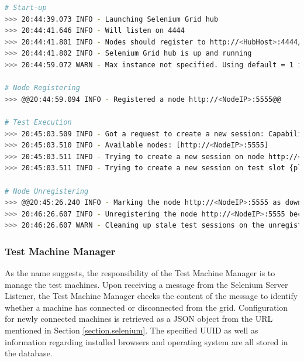 \vspace{4mm}
\noindent\begin{minipage}{\textwidth}
\begin{lstlisting}[caption=Sample Output from Selenium Standalone Server Running as a Hub, label={listing.hub_output}, language=bash, moredelim={[is][keywordstyle]{@@}{@@}}, deletekeywords={for, test}]
# Start-up
>>> 20:44:39.073 INFO - Launching Selenium Grid hub
>>> 20:44:41.646 INFO - Will listen on 4444
>>> 20:44:41.801 INFO - Nodes should register to http://<HubHost>:4444/grid/register/
>>> 20:44:41.802 INFO - Selenium Grid hub is up and running
>>> 20:44:59.072 WARN - Max instance not specified. Using default = 1 instance

# Node Registering
>>> @@20:44:59.094 INFO - Registered a node http://<NodeIP>:5555@@

# Test Execution
>>> 20:45:03.509 INFO - Got a request to create a new session: Capabilities [{browserName=internet explorer, applicationName=1b234276-fc02-11e5-b752-080027f8a664}]
>>> 20:45:03.510 INFO - Available nodes: [http://<NodeIP>:5555]
>>> 20:45:03.511 INFO - Trying to create a new session on node http://<NodeIP>:5555
>>> 20:45:03.511 INFO - Trying to create a new session on test slot {platform=WIN8_1, seleniumProtocol=WebDriver, browserName=internet explorer, applicationName=1b234276-fc02-11e5-b752-080027f8a664, version=9.11.9600.18321}

# Node Unregistering
>>> @@20:45:26.240 INFO - Marking the node http://<NodeIP>:5555 as down: cannot reach the node for 2 tries@@
>>> 20:46:26.607 INFO - Unregistering the node http://<NodeIP>:5555 because it\textquotesingles been down for 60367 milliseconds
>>> 20:46:26.607 WARN - Cleaning up stale test sessions on the unregistered node http://<NodeIP>:5555
\end{lstlisting}
\end{minipage}


\subsubsection{Test Machine Manager}

As the name suggests, the responsibility of the Test Machine Manager is to manage the test machines. Upon receiving a message from the Selenium Server Listener, the Test Machine Manager checks the content of the message to identify whether a machine has connected or disconnected from the grid. Configuration for newly connected machines is retrieved as a JSON object from the URL mentioned in Section \ref{section.selenium}. The specified UUID as well as information regarding installed browsers and operating system are all stored in the database.

